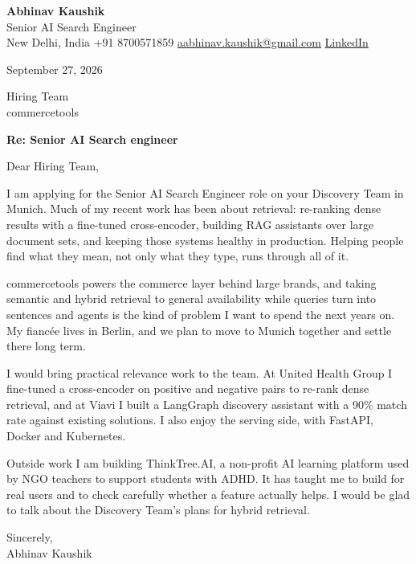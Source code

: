 \documentclass[11pt,a4paper]{article}
\begin{document}
{\Large\bfseries Abhinav Kaushik}\\
Senior AI Search Engineer\\
New Delhi, India \textbar{} +91 8700571859 \textbar{} \href{mailto:aabhinav.kaushik@gmail.com}{aabhinav.kaushik@gmail.com} \textbar{} \href{https://www.linkedin.com/in/abhinav-kaushik10/}{LinkedIn}  

September 27, 2026

Hiring Team\\
commercetools

\textbf{Re: Senior AI Search engineer}

Dear Hiring Team,

I am applying for the Senior AI Search Engineer role on your Discovery Team in Munich. Much of my recent work has been about retrieval: re-ranking dense results with a fine-tuned cross-encoder, building RAG assistants over large document sets, and keeping those systems healthy in production. Helping people find what they mean, not only what they type, runs through all of it.

commercetools powers the commerce layer behind large brands, and taking semantic and hybrid retrieval to general availability while queries turn into sentences and agents is the kind of problem I want to spend the next years on. My fiancée lives in Berlin, and we plan to move to Munich together and settle there long term.

I would bring practical relevance work to the team. At United Health Group I fine-tuned a cross-encoder on positive and negative pairs to re-rank dense retrieval, and at Viavi I built a LangGraph discovery assistant with a 90\% match rate against existing solutions. I also enjoy the serving side, with FastAPI, Docker and Kubernetes.

Outside work I am building ThinkTree.AI, a non-profit AI learning platform used by NGO teachers to support students with ADHD. It has taught me to build for real users and to check carefully whether a feature actually helps. I would be glad to talk about the Discovery Team's plans for hybrid retrieval.

Sincerely,\\[4pt]
Abhinav Kaushik
\end{document}
